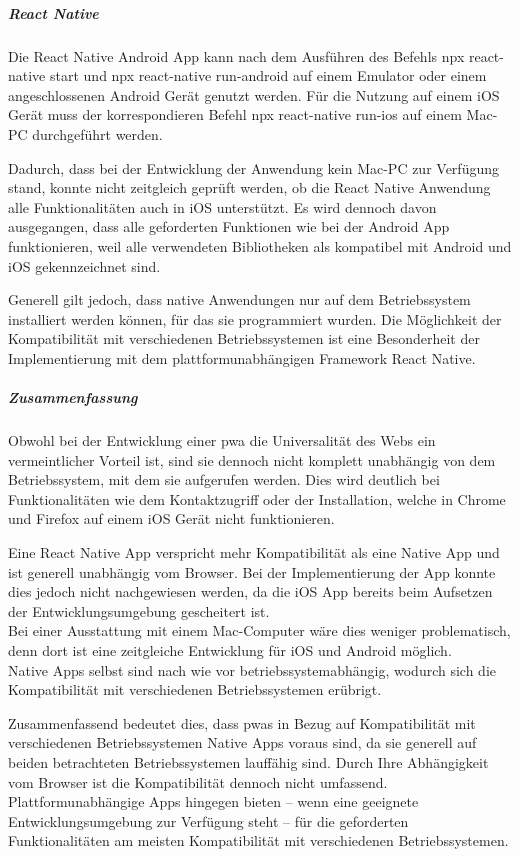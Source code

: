 \subparagraph{React Native\\}
Die React Native Android App kann nach dem Ausführen des Befehls \glqq npx react-native start\grqq{} und \glqq npx react-native run-android\grqq{} auf einem Emulator oder einem angeschlossenen Android Gerät genutzt werden.
Für die Nutzung auf einem iOS Gerät muss der korrespondieren Befehl \glqq npx react-native run-ios\grqq{} auf einem Mac-PC durchgeführt werden.

Dadurch, dass bei der Entwicklung der Anwendung kein Mac-PC zur Verfügung stand, konnte nicht zeitgleich geprüft werden, ob die React Native Anwendung alle Funktionalitäten auch in iOS unterstützt.
Es wird dennoch davon ausgegangen, dass alle geforderten Funktionen wie bei der Android App funktionieren, weil alle verwendeten Bibliotheken als kompatibel mit Android und iOS gekennzeichnet sind.

Generell gilt jedoch, dass native Anwendungen nur auf dem Betriebssystem installiert werden können, für das sie programmiert wurden.
Die Möglichkeit der Kompatibilität mit verschiedenen Betriebssystemen ist eine Besonderheit der Implementierung mit dem plattformunabhängigen Framework React Native.

\subparagraph{Zusammenfassung\\}
Obwohl bei der Entwicklung einer \ac{pwa} die Universalität des Webs ein vermeintlicher Vorteil ist, sind sie dennoch nicht komplett unabhängig von dem Betriebssystem, mit dem sie aufgerufen werden. 
Dies wird deutlich bei Funktionalitäten wie dem Kontaktzugriff oder der Installation, welche in Chrome und Firefox auf einem iOS Gerät nicht funktionieren.

Eine React Native App verspricht mehr Kompatibilität als eine Native App und ist generell unabhängig vom Browser.
Bei der Implementierung der App konnte dies jedoch nicht nachgewiesen werden, da die iOS App bereits beim Aufsetzen der Entwicklungsumgebung gescheitert ist.\\
Bei einer Ausstattung mit einem Mac-Computer wäre dies weniger problematisch, denn dort ist eine zeitgleiche Entwicklung für iOS und Android möglich.\\
Native Apps selbst sind nach wie vor betriebssystemabhängig, wodurch sich die Kompatibilität mit verschiedenen Betriebssystemen erübrigt.

Zusammenfassend bedeutet dies, dass \acp{pwa} in Bezug auf Kompatibilität mit verschiedenen Betriebssystemen Native Apps voraus sind, da sie generell auf beiden betrachteten Betriebssystemen lauffähig sind.
Durch Ihre Abhängigkeit vom Browser ist die Kompatibilität dennoch nicht umfassend. 
Plattformunabhängige Apps hingegen bieten -- wenn eine geeignete Entwicklungsumgebung zur Verfügung steht -- für die geforderten Funktionalitäten am meisten Kompatibilität mit verschiedenen Betriebssystemen.

